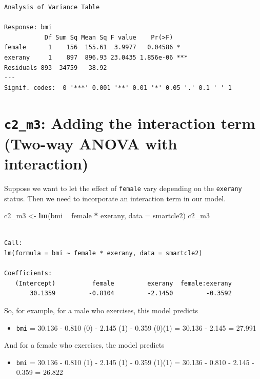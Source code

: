 \documentclass[]{book}
\newenvironment{Shaded}{\begin{snugshade}}{\end{snugshade}}
\newcommand{\KeywordTok}[1]{\textcolor[rgb]{0.13,0.29,0.53}{\textbf{#1}}}
\newcommand{\DataTypeTok}[1]{\textcolor[rgb]{0.13,0.29,0.53}{#1}}
\newcommand{\StringTok}[1]{\textcolor[rgb]{0.31,0.60,0.02}{#1}}
\newcommand{\OperatorTok}[1]{\textcolor[rgb]{0.81,0.36,0.00}{\textbf{#1}}}
\newcommand{\NormalTok}[1]{#1}
\providecommand{\tightlist}{%
  \setlength{\itemsep}{0pt}\setlength{\parskip}{0pt}}
\theoremstyle{definition}
\theoremstyle{definition}
\theoremstyle{definition}
\theoremstyle{remark}
\begin{document}
\begin{verbatim}
Analysis of Variance Table

Response: bmi
           Df Sum Sq Mean Sq F value    Pr(>F)    
female      1    156  155.61  3.9977   0.04586 *  
exerany     1    897  896.93 23.0435 1.856e-06 ***
Residuals 893  34759   38.92                      
---
Signif. codes:  0 '***' 0.001 '**' 0.01 '*' 0.05 '.' 0.1 ' ' 1
\end{verbatim}

\section{\texorpdfstring{\texttt{c2\_m3}: Adding the interaction term
(Two-way ANOVA with
interaction)}{c2\_m3: Adding the interaction term (Two-way ANOVA with interaction)}}\label{c2_m3-adding-the-interaction-term-two-way-anova-with-interaction}

Suppose we want to let the effect of \texttt{female} vary depending on
the \texttt{exerany} status. Then we need to incorporate an interaction
term in our model.

\begin{Shaded}
\begin{Highlighting}[]
\NormalTok{c2_m3 <-}\StringTok{ }\KeywordTok{lm}\NormalTok{(bmi }\OperatorTok{~}\StringTok{ }\NormalTok{female }\OperatorTok{*}\StringTok{ }\NormalTok{exerany, }\DataTypeTok{data =}\NormalTok{ smartcle2)}
\NormalTok{c2_m3}
\end{Highlighting}
\end{Shaded}

\begin{verbatim}

Call:
lm(formula = bmi ~ female * exerany, data = smartcle2)

Coefficients:
   (Intercept)          female         exerany  female:exerany  
       30.1359         -0.8104         -2.1450         -0.3592  
\end{verbatim}

So, for example, for a male who exercises, this model predicts

\begin{itemize}
\tightlist
\item
  \texttt{bmi} = 30.136 - 0.810 (0) - 2.145 (1) - 0.359 (0)(1) = 30.136
  - 2.145 = 27.991
\end{itemize}

And for a female who exercises, the model predicts

\begin{itemize}
\tightlist
\item
  \texttt{bmi} = 30.136 - 0.810 (1) - 2.145 (1) - 0.359 (1)(1) = 30.136
  - 0.810 - 2.145 - 0.359 = 26.822
\end{itemize}
\end{document}
